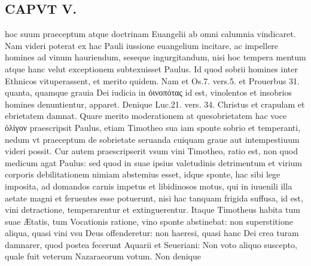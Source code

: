 \documentclass{article}
\begin{document}
\begin{pages}
\section*{CAPVT  V. }
\marginpar{[ p.369 ]}\pstart hoc suum praeceptum atque doctrinam Euangelii ab omni calumnia vindicaret. Nam videri poterat ex hac Pauli iussione euangelium incitare, ac impellere homines ad vinum hauriendum, seseque ingurgitandum, nisi hoc tempera mentum atque hanc velut exceptionem subtexuisset Paulus. Id quod sobrii homines inter Ethnicos vituperassent, et merito quidem. Nam et Os.7. vers.5. et Prouerbus 31. quanta, quamque grauia Dei iudicia in ὀινοπότας id est, vinolentos et insobrios homines denuntientur, apparet. Denique Luc.21. vers. 34. Christus et crapulam et ebrietatem damnat. Quare merito moderationem at quesobrietatem hac voce ὀλίγον praescripsit Paulus, etiam Timotheo sua iam sponte sobrio et temperanti, nedum vt praeceptum de sobrietate seruanda cuiquam graue aut intempestiuum videri possit.  \pend\pstart Cur autem praescripserit vsum vini Timotheo, ratio est, non quod medicum agat Paulus: sed quod in suae ipsius valetudinis detrimentum et virium corporis debilitationem nimiam abstemius esset, idque sponte, hac sibi lege imposita, ad domandos carnis impetus et libidinosos motus, qui in iuuenili illa aetate magni et feruentes esse potuerunt, nisi hac tanquam frigida suffusa, id est, vini detractione, temperarentur et extinguerentur. Itaque Timotheus habita tum suae Ætatis, tum Vocationis ratione, vino sponte abstinebat: non superstitione aliqua, quasi vini vsu Deus offenderetur: non haeresi, quasi hanc Dei crea turam damnarer, quod postea fecerunt Aquarii et Seueriani: Non voto aliquo suscepto, quale fuit veterum Nazaraeorum votum. Non denique  \pend

\end{pages}
\end{document}
